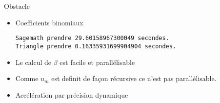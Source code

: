 \documentclass{beamer}
\begin{document}
\begin{frame}[fragile]{Obstacle}
	\begin{itemize}
	\item Coefficients binomiaux
	\begin{verbatim}
Sagemath prendre 29.60158967300049 secondes.
Triangle prendre 0.16335931699904904 secondes.
	\end{verbatim}
	\item Le calcul de $\beta$ est facile et parall\'elisable
	\item Comme \alert{$u_{m}$} est definit de façon r\'ecursive ce n'est pas
		parall\'elisable.
	\item Acc\'el\'eration par pr\'ecision dynamique
	\end{itemize}

\end{frame}


\end{document}
